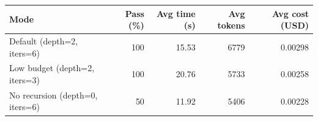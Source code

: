 \begin{tabular}{lrrrr}
\toprule
Mode & Pass (\%) & Avg time (s) & Avg tokens & Avg cost (USD) \\
\midrule
Default (depth=2, iters=6) & 100 & 15.53 & 6779 & 0.00298 \\
Low budget (depth=2, iters=3) & 100 & 20.76 & 5733 & 0.00258 \\
No recursion (depth=0, iters=6) & 50 & 11.92 & 5406 & 0.00228 \\
\bottomrule
\end{tabular}
